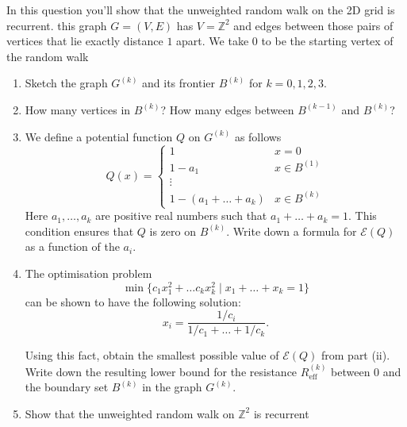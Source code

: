 \documentclass[12 pt, letterpaper]{hmcpset}
\begin{document}
\begin{problem}[48.]
	In this question you'll show that the unweighted random walk on the 2D grid is recurrent. this graph $G = (V, E)$ has $V = \mathbb{Z}^{2}$ and edges between those pairs of vertices that lie exactly distance $1$ apart. We take $0$ to be the starting vertex of the random walk
	\begin{enumerate}
		\item Sketch the graph $G^{(k)}$ and its frontier $B^{(k)}$ for $k = 0, 1, 2, 3$.

		\item How many vertices in $B^{(k)}$? How many edges between $B^{(k - 1)}$ and $B^{(k)}$?

		\item We define a potential function $Q$ on $G^{(k)}$ as follows
			\[
				Q(x) = \begin{cases}
					1 & x = 0 \\
					1 - a_{1} & x \in B^{(1)} \\
					\vdots \\
					1 - (a_{1} + \dots + a_{k}) & x \in B^{(k)}
				\end{cases}
			\]
			Here $a_{1}, \dots, a_{k}$ are positive real numbers such that $a_{1} + \dots + a_{k} = 1$. This condition ensures that $Q$ is zero on $B^{(k)}$. Write down a formula for $\mathcal{E}(Q)$ as a function of the $a_{i}$.

		\item The optimisation problem
			\[
				\min \{ c_{1} x_{1}^{2} + \dots c_{k} x_{k}^{2} \mid x_{1} + \dots + x_{k} = 1 \}
			\]
			can be shown to have the following solution:
			\[
				x_{i} = \frac{1 / c_{i}}{1 / c_{1} + \dots + 1 / c_{k}}.
			\]

			Using this fact, obtain the smallest possible value of $\mathcal{E}(Q)$ from part (ii). Write down the resulting lower bound for the resistance $R^{(k)}_{\text{eff}}$ between $0$ and the boundary set $B^{(k)}$ in the graph $G^{(k)}$.

		\item Show that the unweighted random walk on $\mathbb{Z}^{2}$ is recurrent
	\end{enumerate}
\end{problem}
\end{document}
